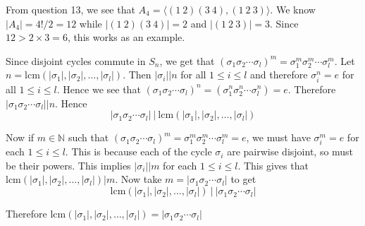 \documentclass[12pt]{exam}
\theoremstyle{plain} %
\theoremstyle{definition} %
\theoremstyle{remark} %
\begin{document}
\begin{questions}
\begin{solution}
  \end{solution}

  \question
  \begin{solution}
    From question 13, we see that $A_4 = \langle (1\ 2)(3\ 4), (1\ 2\ 3) \rangle$. We know $|A_4| = 4!/2 = 12$ while $|(1\ 2)(3\ 4)| = 2$ and $|(1\ 2\ 3)| = 3$. Since $12 > 2\times3 = 6$, this works as an example.
  \end{solution}

  \question
  \begin{solution}
    Since disjoint cycles commute in $S_n$, we get that $(\sigma_1\sigma_2 \cdots \sigma_l)^m = \sigma_1^m \sigma_2^m \cdots \sigma_l^m$. Let $n = \textrm{lcm}(|\sigma_1|, |\sigma_2|, \ldots, |\sigma_l|)$. Then $|\sigma_i|\big|n$ for all $1 \le i \le l$ and therefore $\sigma_i^n = e$ for all $1 \le i \le l$. Hence we see that $(\sigma_1\sigma_2 \cdots \sigma_l)^n = (\sigma_1^n \sigma_2^n \cdots \sigma_l^n) = e$. Therefore $ |\sigma_1\sigma_2 \cdots \sigma_l|\big|n$. Hence $$|\sigma_1\sigma_2 \cdots \sigma_l|\  \Big| \ \textrm{lcm}(|\sigma_1|, |\sigma_2|, \ldots, |\sigma_l|)$$

    Now if $m \in \mathbb{N}$ such that $(\sigma_1\sigma_2 \cdots \sigma_l)^m = \sigma_1^m \sigma_2^m \cdots \sigma_l^m = e$,  we must have $\sigma_i^m = e$ for each $1 \le i \le l$. This is because each of the cycle $\sigma_i$ are pairwise disjoint, so must be their powers. This implies $|\sigma_i|\big| m$ for each $1 \le i \le l$. This gives that $\textrm{lcm}(|\sigma_1|, |\sigma_2|, \ldots, |\sigma_l|) \big| m$. Now take $ m = |\sigma_1\sigma_2 \cdots \sigma_l|$ to get $$\textrm{lcm}(|\sigma_1|, |\sigma_2|, \ldots, |\sigma_l|)\  \Big| \  |\sigma_1\sigma_2 \cdots \sigma_l|$$

    Therefore $\textrm{lcm}(|\sigma_1|, |\sigma_2|, \ldots, |\sigma_l|) = |\sigma_1\sigma_2 \cdots \sigma_l|$
  \end{solution}

  \question
  \begin{solution}
     \begin{parts}

\end{parts}
\end{solution}
\end{questions}
\end{document}
